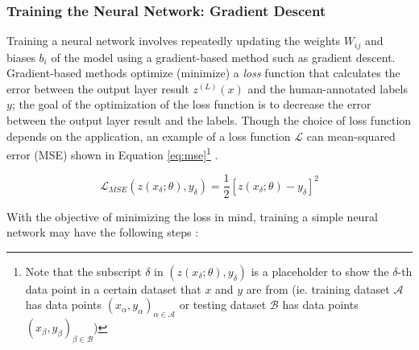 \subsubsection{Training the Neural Network: Gradient Descent}
Training a neural network involves repeatedly updating the weights $W_{ij}$ and biases $b_i$ of the model using a gradient-based method such as gradient descent. Gradient-based methods optimize (minimize) a \textit{loss} function that calculates the error between the output layer result $z^{(L)}(x)$ and the human-annotated labels $y$; the goal of the optimization of the loss function is to decrease the error between the output layer result and the labels. Though the choice of loss function depends on the application, an example of a loss function $\mathcal{L}$ can mean-squared error (MSE) shown in Equation \ref{eq:mse}\footnote{Note that the subscript $\delta$ in $(z(x_\delta;\theta), y_\delta)$ is a placeholder to show the $\delta$-th data point in a certain dataset that $x$ and $y$ are from (ie. training dataset $\mathcal{A}$ has data points $(x_\alpha, y_\alpha)_{\alpha \in \mathcal{A}}$ or testing dataset $\mathcal{B}$ has data points $(x_\beta, y_\beta)_{\beta \in \mathcal{B}}$)} \cite{robertsPrinciplesDeepLearning2022b}.

\begin{equation}
    \label{eq:mse}
    \mathcal{L}_{MSE}(z(x_\delta;\theta), y_\delta) = \frac{1}{2}\left[z(x_\delta; \theta)-y_\delta \right]^2
\end{equation}


With the objective of minimizing the loss in mind, training a simple neural network may have the following steps \cite{robertsPrinciplesDeepLearning2022b}:

